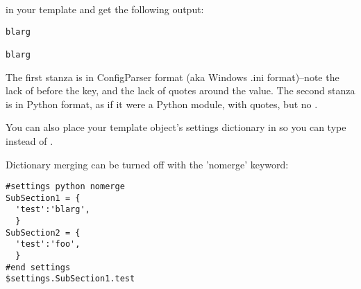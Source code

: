 in your template and get the following output:

\begin{verbatim}
blarg

blarg
\end{verbatim}

The first stanza is in ConfigParser format (aka Windows .ini format)--note the
lack of \code{\$} before the key, and the lack of quotes around the value.  The
second stanza is in Python format, as if it were a Python module, with quotes,
but no \code{\$}.

You can also place your template object's settings dictionary in  so you can type  instead of
.

Dictionary merging can be turned off with the 'nomerge' keyword:

\begin{verbatim}
#settings python nomerge
SubSection1 = {
  'test':'blarg',
  }
SubSection2 = {
  'test':'foo',
  }
#end settings
$settings.SubSection1.test
\end{verbatim}

